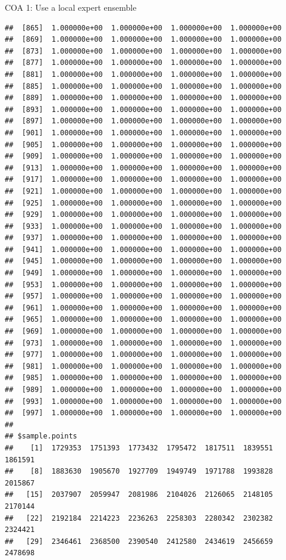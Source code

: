 \documentclass[ignorenonframetext,]{beamer}
\begin{document}
\begin{frame}[fragile]{COA 1: Use a local expert ensemble}
\begin{verbatim}
##  [865]  1.000000e+00  1.000000e+00  1.000000e+00  1.000000e+00
##  [869]  1.000000e+00  1.000000e+00  1.000000e+00  1.000000e+00
##  [873]  1.000000e+00  1.000000e+00  1.000000e+00  1.000000e+00
##  [877]  1.000000e+00  1.000000e+00  1.000000e+00  1.000000e+00
##  [881]  1.000000e+00  1.000000e+00  1.000000e+00  1.000000e+00
##  [885]  1.000000e+00  1.000000e+00  1.000000e+00  1.000000e+00
##  [889]  1.000000e+00  1.000000e+00  1.000000e+00  1.000000e+00
##  [893]  1.000000e+00  1.000000e+00  1.000000e+00  1.000000e+00
##  [897]  1.000000e+00  1.000000e+00  1.000000e+00  1.000000e+00
##  [901]  1.000000e+00  1.000000e+00  1.000000e+00  1.000000e+00
##  [905]  1.000000e+00  1.000000e+00  1.000000e+00  1.000000e+00
##  [909]  1.000000e+00  1.000000e+00  1.000000e+00  1.000000e+00
##  [913]  1.000000e+00  1.000000e+00  1.000000e+00  1.000000e+00
##  [917]  1.000000e+00  1.000000e+00  1.000000e+00  1.000000e+00
##  [921]  1.000000e+00  1.000000e+00  1.000000e+00  1.000000e+00
##  [925]  1.000000e+00  1.000000e+00  1.000000e+00  1.000000e+00
##  [929]  1.000000e+00  1.000000e+00  1.000000e+00  1.000000e+00
##  [933]  1.000000e+00  1.000000e+00  1.000000e+00  1.000000e+00
##  [937]  1.000000e+00  1.000000e+00  1.000000e+00  1.000000e+00
##  [941]  1.000000e+00  1.000000e+00  1.000000e+00  1.000000e+00
##  [945]  1.000000e+00  1.000000e+00  1.000000e+00  1.000000e+00
##  [949]  1.000000e+00  1.000000e+00  1.000000e+00  1.000000e+00
##  [953]  1.000000e+00  1.000000e+00  1.000000e+00  1.000000e+00
##  [957]  1.000000e+00  1.000000e+00  1.000000e+00  1.000000e+00
##  [961]  1.000000e+00  1.000000e+00  1.000000e+00  1.000000e+00
##  [965]  1.000000e+00  1.000000e+00  1.000000e+00  1.000000e+00
##  [969]  1.000000e+00  1.000000e+00  1.000000e+00  1.000000e+00
##  [973]  1.000000e+00  1.000000e+00  1.000000e+00  1.000000e+00
##  [977]  1.000000e+00  1.000000e+00  1.000000e+00  1.000000e+00
##  [981]  1.000000e+00  1.000000e+00  1.000000e+00  1.000000e+00
##  [985]  1.000000e+00  1.000000e+00  1.000000e+00  1.000000e+00
##  [989]  1.000000e+00  1.000000e+00  1.000000e+00  1.000000e+00
##  [993]  1.000000e+00  1.000000e+00  1.000000e+00  1.000000e+00
##  [997]  1.000000e+00  1.000000e+00  1.000000e+00  1.000000e+00
## 
## $sample.points
##    [1]  1729353  1751393  1773432  1795472  1817511  1839551  1861591
##    [8]  1883630  1905670  1927709  1949749  1971788  1993828  2015867
##   [15]  2037907  2059947  2081986  2104026  2126065  2148105  2170144
##   [22]  2192184  2214223  2236263  2258303  2280342  2302382  2324421
##   [29]  2346461  2368500  2390540  2412580  2434619  2456659  2478698

\end{verbatim}
\end{frame}
\end{document}
